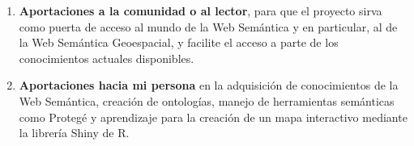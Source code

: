 \begin{enumerate}
	\item \textbf{Aportaciones a la comunidad o al lector}, para que el proyecto sirva como puerta de acceso al mundo de la Web Semántica y en particular, al de la Web Semántica Geoespacial, y facilite el acceso a parte de los conocimientos actuales disponibles.
	
	\item \textbf{Aportaciones hacia mi persona} en la adquisición de conocimientos de la Web Semántica, creación de ontologías, manejo de herramientas semánticas como Protegé y aprendizaje para la creación de un mapa interactivo mediante la librería Shiny de R.	

	
	
	
	
	
	
	
	

\end{enumerate}


